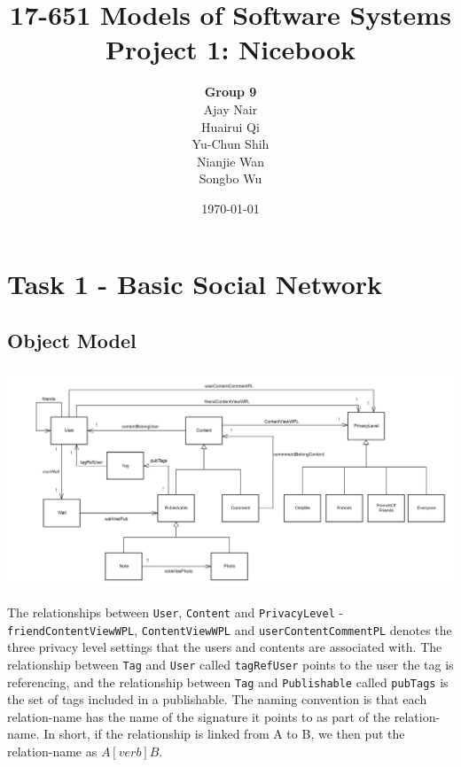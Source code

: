 \documentclass[titlepage]{article}
\begin{document}
\title{17-651 Models of Software Systems\\[1ex] Project 1: Nicebook}
\author{
{\Large\textbf{Group 9}}\\[3ex]
Ajay Nair\\[1ex] Huairui Qi\\[1ex] Yu-Chun Shih\\[1ex] Nianjie Wan\\[1ex]Songbo Wu}
\date{\today}
\maketitle

\section{Task 1 - Basic Social Network}

\subsection{Object Model}
\includegraphics[width=6in]{NiceBookObjectModel.png}

The relationships between \texttt{User}, \texttt{Content} and \texttt{PrivacyLevel} - \texttt{friendContentViewWPL}, \texttt{ContentViewWPL} and \texttt{userContentCommentPL} denotes the three privacy level settings that the users and contents are associated with. The relationship between \texttt{Tag} and \texttt{User} called \texttt{tagRefUser} points to the user the tag is referencing, and the relationship between
\texttt{Tag} and \texttt{Publishable} called \texttt{pubTags} is the set of tags included in a publishable. The naming convention is that each relation-name has the name of the signature it points to as part of the relation-name. In short, if the relationship is linked from A to B, we then put the relation-name as $A[verb]B$.
\end{document}
